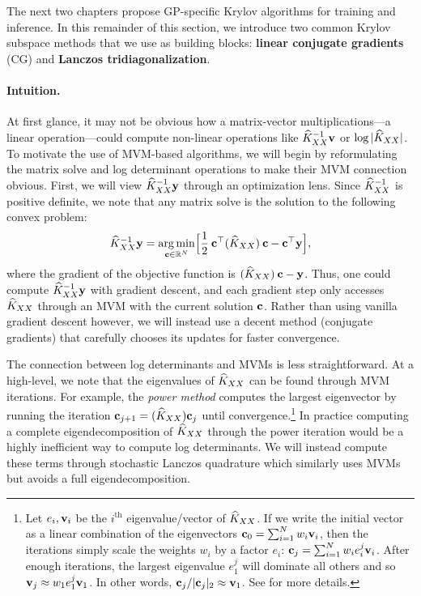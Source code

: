 The next two chapters propose GP-specific Krylov algorithms for training and inference.
In this remainder of this section, we introduce two common Krylov subspace methods that we use as building blocks: {\bf linear conjugate gradients} (CG) and {\bf Lanczos tridiagonalization}.

\paragraph{Intuition.}
At first glance, it may not be obvious how a matrix-vector multiplications---a linear operation---could compute non-linear operations like $\widehat{K}_{XX}^{-1} \mathbf{v}$ or $\log \vert \widehat{K}_{XX} \vert$.
To motivate the use of MVM-based algorithms, we will begin by reformulating the matrix solve and log determinant operations to make their MVM connection obvious.
First, we will view $\widehat{K}_{XX}^{-1} \mathbf{y}$ through an optimization lens.
Since $\widehat{K}_{XX}^{-1}$ is positive definite, we note that any matrix solve is the solution to the following convex problem:
%
\begin{equation}
  \widehat{K}_{XX}^{-1} \mathbf{y} = \operatorname*{arg\,min}_{\mathbf{c} \in \mathbb{R}^{N}} \Bigl[ \frac{1}{2} \: \mathbf{c}^\top (\widehat{K}_{XX}) \: \mathbf{c} - \mathbf{c}^\top \mathbf{y} \Bigr],
  \label{eqn:solve_as_optim}
\end{equation}
%
where the gradient of the objective function is $(\widehat{K}_{XX}) \: \mathbf{c} - \mathbf{y}$.
Thus, one could compute $\widehat{K}_{XX}^{-1} \mathbf{y}$ with gradient descent, and each gradient step only accesses $\widehat{K}_{XX}$ through an MVM with the current solution $\mathbf{c}$.
Rather than using vanilla gradient descent however, we will instead use a decent method (conjugate gradients) that carefully chooses its updates for faster convergence.

The connection between log determinants and MVMs is less straightforward.
At a high-level, we note that the eigenvalues of $\widehat{K}_{XX}$ can be found through MVM iterations.
For example, the \emph{power method} computes the largest eigenvector by running the iteration $\mathbf{c}_{j+1} = (\widehat{K}_{XX}) \mathbf{c}_{j}$ until convergence.\footnote{
  Let $e_i, \mathbf{v}_i$ be the $i^\text{th}$ eigenvalue/vector of $\widehat{K}_{XX}$.
  If we write the initial vector as a linear combination of the eigenvectors $\mathbf{c}_{0} = \sum_{i=1}^N w_i \mathbf{v}_i$, then the iterations simply scale the weights $w_i$ by a factor $e_i$:
  $\mathbf{c}_{j} = \sum_{i=1}^N w_i e_i^j \mathbf{v}_i$.
  After enough iterations, the largest eigenvalue $e_1^j$ will dominate all others and so $\mathbf{v}_{j} \approx w_1 e_1^j \mathbf{v}_1$.
  In other words, $\mathbf{c}_{j} / \vert \mathbf{c}_{j} \vert_2 \approx \mathbf{v}_1$.
  See \citep[e.g.][Ch. 8]{golub2012matrix} for more details.
}
In practice computing a complete eigendecomposition of $\widehat{K}_{XX}$ through the power iteration would be a highly inefficient way to compute log determinants.
We will instead compute these terms through stochastic Lanczos quadrature \citep{ubaru2017fast} which similarly uses MVMs but avoids a full eigendecomposition.

